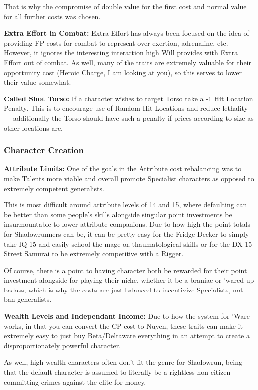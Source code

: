 \begin{multicols*}{2}
	That is why the compromise of double value for the first cost and normal value for all further costs was chosen. 
	
	\textbf{Extra Effort in Combat:} Extra Effort has always been focused on the idea of providing FP costs for combat to represent over exertion, adrenaline, etc. However, it ignores the interesting interaction high Will provides with Extra Effort out of combat. As well, many of the traits are extremely valuable for their opportunity cost (Heroic Charge, I am looking at you), so this serves to lower their value somewhat.
	
	\textbf{Called Shot Torso:} If a character wishes to target Torso take a -1 Hit Location Penalty. This is to encourage use of Random Hit Locations and reduce lethality — additionally the Torso should have such a penalty if prices according to size as other locations are.
	
	\subsubsection{Character Creation}
	
	\textbf{Attribute Limits: } One of the goals in the Attribute cost rebalancing was to make Talents more viable and overall promote Specialist characters as opposed to extremely competent generalists. 
	
	This is most difficult around attribute levels of 14 and 15, where defaulting can be better than some people's skills alongside singular point investments be insurmountable to lower attribute companions. Due to how high the point totals for Shadowrunners can be, it can be pretty easy for the Fridge Decker to simply take IQ 15 and easily school the mage on thaumatological skills or for the DX 15 Street Samurai to be extremely competitive with a Rigger.
	
	Of course, there is a point to having character both be rewarded for their point investment alongside for playing their niche, whether it be a braniac or 'wared up badass, which is why the costs are just balanced to incentivize Specialists, not ban generalists.
	
	\textbf{Wealth Levels and Independant Income: } Due to how the system for 'Ware works, in that you can convert the CP cost to Nuyen, these traits can make it extremely easy to just buy Beta/Deltaware everything in an attempt to create a disproportionately powerful character.
	
	As well, high wealth characters often don't fit the genre for Shadowrun, being that the default character is assumed to literally be a rightless non-citizen committing crimes against the elite for money.
	

\end{multicols*}
